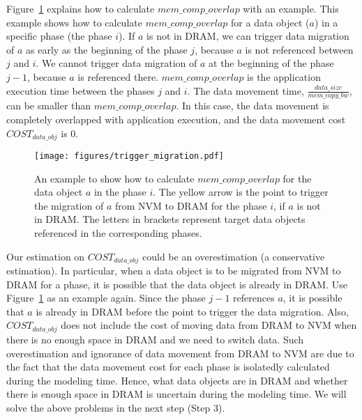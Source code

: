 \begin{comment}
Given a phase $i$ and a data object to be migrated for $i$, we trigger the movement of this data object in the beginning of a preceding phase $j$. Between the phases $j$ (including the phase $j$) and $i$, the data object is not referenced, while the immediately preceding phase of the phase $j$ references the data object. $mem\_comp\_overlap$ is the application execution time between the phases $j$ and $i$. 
\end{comment}

Figure~\ref{fig:trigger_migration} explains how to calculate 
$mem\_comp\_overlap$ with an example. This example shows how to calculate
$mem\_comp\_overlap$ for a data object ($a$)  in a specific phase (the phase $i$). 
If $a$ is not in DRAM, we can trigger data migration of $a$ as early as the beginning of the phase $j$, because $a$ is not referenced between $j$ and $i$. 
We cannot trigger data migration of $a$
at the beginning of the phase $j-1$, because $a$ is referenced there. $mem\_comp\_overlap$ is the application execution time between the phases $j$ and $i$. The data movement time, $\frac{data\_size}{mem\_copy\_bw}$, can
be smaller than $mem\_comp\_overlap$. In this case, the data movement
is completely overlapped with application execution, and the data movement cost $COST_{data\_ obj}$ is 0.

\begin{figure}
  \centering
  \texttt{[image: figures/trigger\_migration.pdf]}
  \vspace{-10pt}
  \caption{An example to show how to calculate $mem\_comp\_overlap$  for the data object $a$ in the phase $i$. The yellow arrow is the point to trigger the migration of $a$ from NVM to DRAM for the phase $i$, if $a$ is not in DRAM. The letters in brackets represent target data objects referenced in the corresponding phases.}
\label{fig:trigger_migration}
\vspace{-15pt}
\end{figure}

Our estimation on $COST_{data\_obj}$ could be an overestimation (a conservative estimation). In particular,
when a data object is to be migrated from NVM to DRAM for a phase,
it is possible that the data object is already in DRAM.
Use Figure~\ref{fig:trigger_migration} as an example again.
Since the phase $j-1$ references $a$, it is possible that
$a$ is already in DRAM before the point to trigger the data migration.
Also, $COST_{data\_obj}$ does not include the cost of moving data from 
DRAM to NVM when there is no enough space in DRAM and we need to switch data.
Such overestimation and ignorance of data movement from DRAM to NVM are due to the fact that the data movement cost
for each phase is isolatedly calculated during the modeling time.
Hence, what data objects are in DRAM and whether there is enough space in DRAM is uncertain during the modeling time. We will solve the above problems in the next step (Step 3). 


